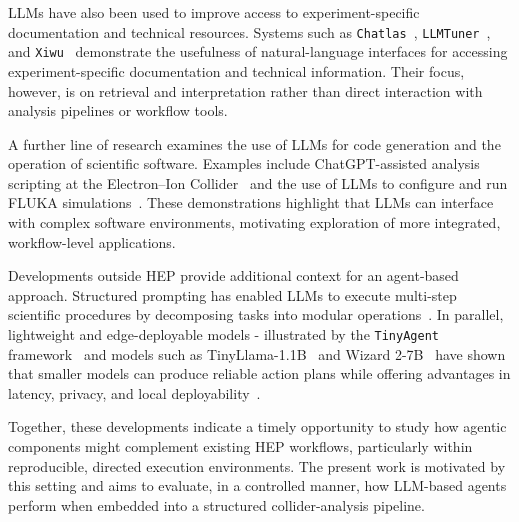 \documentclass[aps,prd,reprint,superscriptaddress]{revtex4-2}
\begin{document}
LLMs have also been used to improve access to experiment-specific documentation and technical resources. Systems such as \texttt{Chatlas}~\citep{DalSanto:2935252}, \texttt{LLMTuner}~\citep{schnabel2025largelanguagemodelsnew}, and \texttt{Xiwu}~\citep{xiwu} demonstrate the usefulness of natural-language interfaces for accessing experiment-specific documentation and technical information. Their focus, however, is on retrieval and interpretation rather than direct interaction with analysis pipelines or workflow tools.

A further line of research examines the use of LLMs for code generation and the operation of scientific software. Examples include ChatGPT-assisted analysis scripting at the Electron–Ion Collider~\citep{eic} and the use of LLMs to configure and run FLUKA simulations~\citep{ndum2024autoflukalargelanguagemodel,fluka}. These demonstrations highlight that LLMs can interface with complex software environments, motivating exploration of more integrated, workflow-level applications.

Developments outside HEP provide additional context for an agent-based approach. Structured prompting has enabled LLMs to execute multi-step scientific procedures by decomposing tasks into modular operations~\citep{Pan2025LLMHF,reasoner,benchmark}. In parallel, lightweight and edge-deployable models - illustrated by the \texttt{TinyAgent} framework~\citep{tinyagent} and models such as TinyLlama-1.1B~\citep{tinyllama} and Wizard 2-7B~\citep{wizard} have shown that smaller models can produce reliable action plans while offering advantages in latency, privacy, and local deployability~\citep{hammer,hera,dot}.

Together, these developments indicate a timely opportunity to study how agentic components might complement existing HEP workflows, particularly within reproducible, directed execution environments. The present work is motivated by this setting and aims to evaluate, in a controlled manner, how LLM-based agents perform when embedded into a structured collider-analysis pipeline. 
\end{document}
